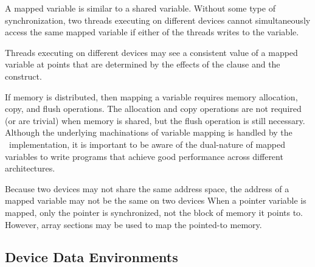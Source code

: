 A mapped variable is similar to a shared variable.  Without some 
type of synchronization, two threads executing on
different devices cannot simultaneously access the same mapped variable if
either of the threads writes to the variable.  

Threads executing on different devices may see a consistent value of a mapped
variable at points that are determined by the effects of the  clause
and the  construct.

If memory is distributed, then mapping a variable requires memory allocation,
copy, and flush operations.  The allocation and copy operations are not
required (or are trivial) when memory is shared, but the flush
operation is still necessary.  Although the underlying machinations of variable mapping
is handled by the \OMP\ implementation, it is important to be aware
of the dual-nature of mapped variables to write programs that 
achieve good performance across different architectures.  

Because two devices may not share the same address space,
the address of a mapped variable may not be the same on two devices
When a pointer variable is mapped, only the pointer is synchronized, not the
block of memory it points to.  However, array sections may be used to map the
pointed-to memory.



\subsection{Device Data Environments}
\label{ssec:06.device-data-environments}


